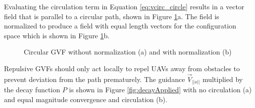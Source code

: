 \documentclass[numbered,pdftex]{ohio-etd}
\begin{document}
\noindent
Evaluating the circulation term in Equation \ref{eq:vcirc_circle} results in a vector field that is parallel to a circular path, shown in Figure \ref{fig:gvfCircCirculation}a. The field is normalized to produce a field with equal length vectors for the configuration space which is shown in Figure \ref{fig:gvfCircCirculation}b. 

\begin{figure}[H]
	\begin{subfigmatrix}{2}%
		\centering	
		\hspace*{0mm}
	\end{subfigmatrix}
	\caption{Circular GVF without normalization (a) and with normalization (b)}
	\label{fig:gvfCircCirculation}
\end{figure}


Repulsive GVFs should only act locally to repel UAVs away from obstacles to prevent deviation from the path prematurely. The guidance $\overrightarrow{V}_{||o||}$ multiplied by the decay function $P$ is shown in Figure \ref{fig:decayApplied} with no circulation (a) and equal magnitude convergence and circulation (b).
\end{document}
